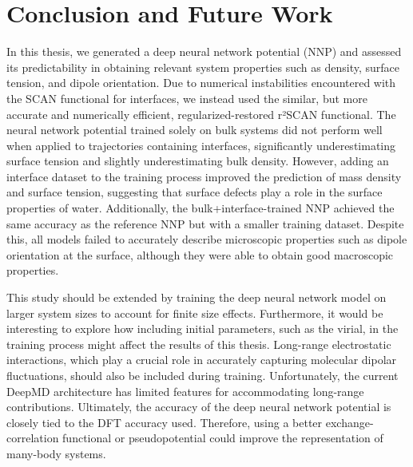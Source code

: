 \chapter{Conclusion and Future Work}

In this thesis, we generated a deep neural network potential (NNP) and assessed its predictability in obtaining relevant system properties such as density, surface tension, and dipole orientation. Due to numerical instabilities encountered with the SCAN functional for interfaces, we instead used the similar, but more accurate and numerically efficient, regularized-restored r²SCAN functional. The neural network potential trained solely on bulk systems did not perform well when applied to trajectories containing interfaces, significantly underestimating surface tension and slightly underestimating bulk density. However, adding an interface dataset to the training process improved the prediction of mass density and surface tension, suggesting that surface defects play a role in the surface properties of water. Additionally, the bulk+interface-trained NNP achieved the same accuracy as the reference NNP but with a smaller training dataset. Despite this, all models failed to accurately describe microscopic properties such as dipole orientation at the surface, although they were able to obtain good macroscopic properties.

This study should be extended by training the deep neural network model on larger system sizes to account for finite size effects. Furthermore, it would be interesting to explore how including initial parameters, such as the virial, in the training process might affect the results of this thesis. Long-range electrostatic interactions, which play a crucial role in accurately capturing molecular dipolar fluctuations, should also be included during training. Unfortunately, the current DeepMD architecture has limited features for accommodating long-range contributions. Ultimately, the accuracy of the deep neural network potential is closely tied to the DFT accuracy used. Therefore, using a better exchange-correlation functional or pseudopotential could improve the representation of many-body systems.

